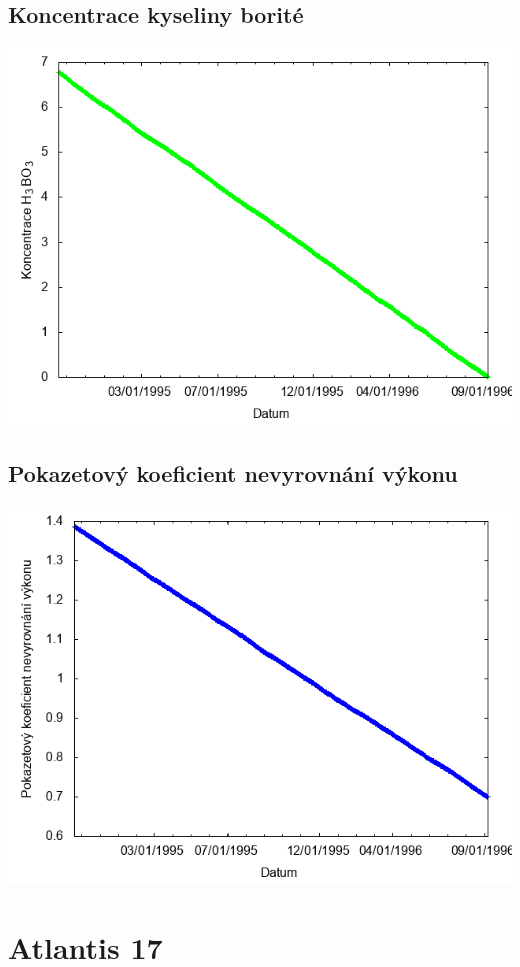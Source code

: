 \documentclass[a4paper,twoside,11pt]{article}
\begin{document}
\subsection*{Koncentrace kyseliny borité}
\begin{center}
\includegraphics[width=.8\textwidth]{graphs/Atlantis_16_bc.png}
\end{center}

\subsection*{Pokazetový koeficient nevyrovnání výkonu}
\begin{center}
\includegraphics[width=.8\textwidth]{graphs/Atlantis_16_fha.png}
\end{center}

\newpage
\section*{Atlantis 17}
\end{document}
